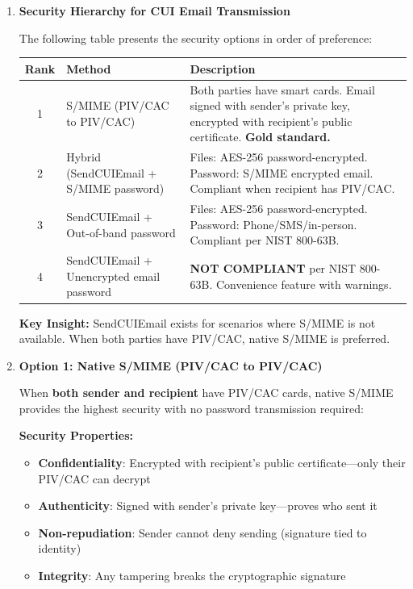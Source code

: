 \documentclass[11pt,letterpaper]{article}
\newcommand{\dmsection}[1]{\item \textbf{#1}\par}
\begin{document}
\begin{enumerate}
\dmsection{Security Hierarchy for CUI Email Transmission}

The following table presents the security options in order of preference:

\begin{tabularx}{\textwidth}{|c|l|X|}
\hline
\textbf{Rank} & \textbf{Method} & \textbf{Description} \\
\hline
1 & S/MIME (PIV/CAC to PIV/CAC) & Both parties have smart cards. Email signed with sender's private key, encrypted with recipient's public certificate. \textbf{Gold standard.} \\
\hline
2 & Hybrid (SendCUIEmail + S/MIME password) & Files: AES-256 password-encrypted. Password: S/MIME encrypted email. Compliant when recipient has PIV/CAC. \\
\hline
3 & SendCUIEmail + Out-of-band password & Files: AES-256 password-encrypted. Password: Phone/SMS/in-person. Compliant per NIST 800-63B. \\
\hline
4 & SendCUIEmail + Unencrypted email password & \textbf{NOT COMPLIANT} per NIST 800-63B. Convenience feature with warnings. \\
\hline
\end{tabularx}

\vspace{12pt}

\textbf{Key Insight:} SendCUIEmail exists for scenarios where S/MIME is not available. When both parties have PIV/CAC, native S/MIME is preferred.

\dmsection{Option 1: Native S/MIME (PIV/CAC to PIV/CAC)}

When \textbf{both sender and recipient} have PIV/CAC cards, native S/MIME provides the highest security with no password transmission required:

\textbf{Security Properties:}
\begin{itemize}
    \item \textbf{Confidentiality}: Encrypted with recipient's public certificate---only their PIV/CAC can decrypt
    \item \textbf{Authenticity}: Signed with sender's private key---proves who sent it
    \item \textbf{Non-repudiation}: Sender cannot deny sending (signature tied to identity)
    \item \textbf{Integrity}: Any tampering breaks the cryptographic signature
\end{itemize}


\end{enumerate}
\end{document}
